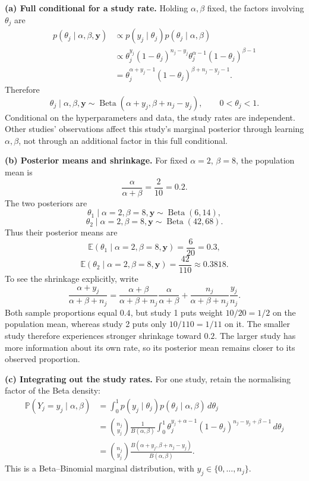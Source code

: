 \documentclass[11pt,a4paper]{article}
\newcommand{\E}{\mathbb{E}}
\begin{document}
\textbf{(a) Full conditional for a study rate.}
Holding $\alpha,\beta$ fixed, the factors involving $\theta_j$ are
\[
\begin{aligned}
p(\theta_j\mid\alpha,\beta,\mathbf y)
&\propto p(y_j\mid\theta_j)p(\theta_j\mid\alpha,\beta)\\
&\propto\theta_j^{y_j}(1-\theta_j)^{n_j-y_j}
\theta_j^{\alpha-1}(1-\theta_j)^{\beta-1}\\
&=\theta_j^{\alpha+y_j-1}(1-\theta_j)^{\beta+n_j-y_j-1}.
\end{aligned}
\]
Therefore
\[
\boxed{\theta_j\mid\alpha,\beta,\mathbf y
\sim\operatorname{Beta}(\alpha+y_j,\beta+n_j-y_j),\qquad 0<\theta_j<1.}
\]
Conditional on the hyperparameters and data, the study rates are independent.
Other studies' observations affect this study's marginal posterior through
learning $\alpha,\beta$, not through an additional factor in this full conditional.

\textbf{(b) Posterior means and shrinkage.}
For fixed $\alpha=2$, $\beta=8$, the population mean is
\[
\frac{\alpha}{\alpha+\beta}=\frac2{10}=0.2.
\]
The two posteriors are
\[
\theta_1\mid\alpha=2,\beta=8,\mathbf y\sim\operatorname{Beta}(6,14),
\]
\[
\theta_2\mid\alpha=2,\beta=8,\mathbf y\sim\operatorname{Beta}(42,68).
\]
Thus their posterior means are
\[
\boxed{\E(\theta_1\mid\alpha=2,\beta=8,\mathbf y)=\frac6{20}=0.3,}
\]
\[
\boxed{\E(\theta_2\mid\alpha=2,\beta=8,\mathbf y)=\frac{42}{110}
\approx0.3818.}
\]
To see the shrinkage explicitly, write
\[
\frac{\alpha+y_j}{\alpha+\beta+n_j}
=\frac{\alpha+\beta}{\alpha+\beta+n_j}
\frac{\alpha}{\alpha+\beta}
+\frac{n_j}{\alpha+\beta+n_j}\frac{y_j}{n_j}.
\]
Both sample proportions equal $0.4$, but study 1 puts weight $10/20=1/2$
on the population mean, whereas study 2 puts only $10/110=1/11$ on it.
The smaller study therefore experiences stronger shrinkage toward $0.2$.
The larger study has more information about its own rate, so its posterior
mean remains closer to its observed proportion.

\textbf{(c) Integrating out the study rates.}
For one study, retain the normalising factor of the Beta density:
\[
\begin{aligned}
\mathbb{P}(Y_j=y_j\mid\alpha,\beta)
&=\int_0^1 p(y_j\mid\theta_j)p(\theta_j\mid\alpha,\beta)\,d\theta_j\\
&=\binom{n_j}{y_j}\frac1{B(\alpha,\beta)}
\int_0^1\theta_j^{y_j+\alpha-1}
(1-\theta_j)^{n_j-y_j+\beta-1}\,d\theta_j\\
&=\boxed{\binom{n_j}{y_j}
\frac{B(\alpha+y_j,\beta+n_j-y_j)}{B(\alpha,\beta)}.}
\end{aligned}
\]
This is a Beta--Binomial marginal distribution, with
$y_j\in\{0,\ldots,n_j\}$.
\end{document}
